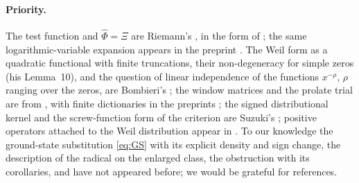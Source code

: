 \paragraph{Priority.} The test function and $\widehat\Phi=\Xi$ are Riemann's \cite{Riemann1859}, in the form of
\cite[(7.1)--(7.2), Lemma 7.1]{CCM-ZST-2025}; the same logarithmic-variable expansion appears in the preprint \cite{Freedman2026}.
The Weil form as a quadratic functional with finite truncations, their non-degeneracy for simple zeros (his Lemma~10), and the
question of linear independence of the functions $x^{-\rho}$, $\rho$ ranging over the zeros, are Bombieri's \cite{BOMBIERI-WEILQF-2000}; the window matrices and the
prolate trial are from \cite{CCM-ZST-2025}, with finite dictionaries in the preprints \cite{Groskin2026,Freedman2026}; the signed
distributional kernel and the screw-function form of the criterion are Suzuki's \cite{Suzuki2025,Suzuki2026}; positive operators
attached to the Weil distribution appear in \cite{Li2024}. To our knowledge the ground-state substitution \eqref{eq:GS} with its
explicit density and sign change, the description of the radical on the enlarged class, the obstruction  with its
corollaries, and  have not appeared before; we would be grateful for references.
